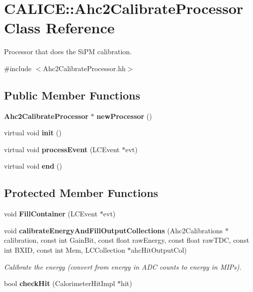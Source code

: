 \section{CALICE::Ahc2CalibrateProcessor Class Reference}
\label{classCALICE_1_1Ahc2CalibrateProcessor}


Processor that does the SiPM calibration.  


{\ttfamily \#include $<$Ahc2CalibrateProcessor.hh$>$}\subsection*{Public Member Functions}
\begin{DoxyCompactItemize}
\item 
{\bf Ahc2CalibrateProcessor} $\ast$ {\bfseries newProcessor} ()\label{classCALICE_1_1Ahc2CalibrateProcessor_a57d619e6f0986ae6a02cbced83acc6f5}

\item 
virtual void {\bfseries init} ()\label{classCALICE_1_1Ahc2CalibrateProcessor_ad821f0bc1b0bd316e93eba7a24b7a723}

\item 
virtual void {\bfseries processEvent} (LCEvent $\ast$evt)\label{classCALICE_1_1Ahc2CalibrateProcessor_a95d7418cc0c13b2e941f64bc222fb8b6}

\item 
virtual void {\bfseries end} ()\label{classCALICE_1_1Ahc2CalibrateProcessor_a1f22d5d38c38ef430e218e82d532802e}

\end{DoxyCompactItemize}
\subsection*{Protected Member Functions}
\begin{DoxyCompactItemize}
\item 
void {\bfseries FillContainer} (LCEvent $\ast$evt)\label{classCALICE_1_1Ahc2CalibrateProcessor_acaa509d1340c3afffb7f3eea852397f5}

\item 
void {\bf calibrateEnergyAndFillOutputCollections} (Ahc2Calibrations $\ast$calibration, const int GainBit, const float rawEnergy, const float rawTDC, const int BXID, const int Mem, LCCollection $\ast$ahcHitOutputCol)
\begin{DoxyCompactList}\small\item\em Calibrate the energy (convert from energy in ADC counts to energy in MIPs). \item\end{DoxyCompactList}\item 
bool {\bfseries checkHit} (CalorimeterHitImpl $\ast$hit)\label{classCALICE_1_1Ahc2CalibrateProcessor_aaa5a4d84225a0455058ec8ab24f650b1}

\end{DoxyCompactItemize}
